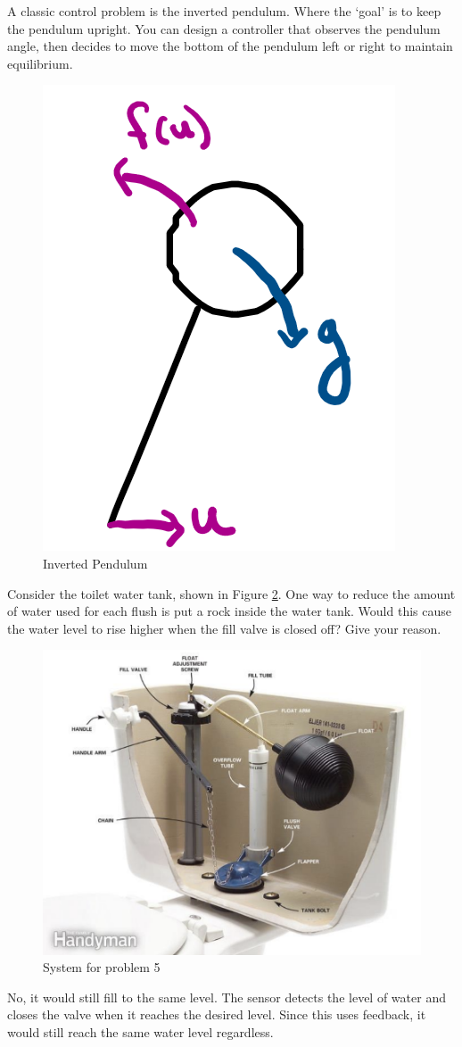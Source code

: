 \documentclass[11pt]{article}
\begin{document}
\soln

A classic control problem is the inverted pendulum.
Where the `goal' is to keep the pendulum upright.
You can design a controller that observes the pendulum angle,
then decides to move the bottom of the pendulum left or right to maintain equilibrium.

\begin{figure}[h] 
    \centering
    \includegraphics[width=0.35 \linewidth]{p4}
    \caption{Inverted Pendulum}
    \label{fig:p4}
\end{figure}


Consider the toilet water tank, shown in Figure \ref{fig:16}. One way to reduce the
amount of water used for each flush is put a rock inside the water tank. Would this cause
the water level to rise higher when the fill valve is closed off? Give your reason.

\begin{figure}[h] 
    \centering
    \includegraphics[width=0.55 \linewidth]{fig16.png}
    \caption{System for problem 5}
    \label{fig:16}
\end{figure}

\soln


No, it would still fill to the same level.
The sensor detects the level of water and closes the valve when it reaches the desired level.
Since this uses feedback, it would still reach the same water level regardless.
\end{document}
